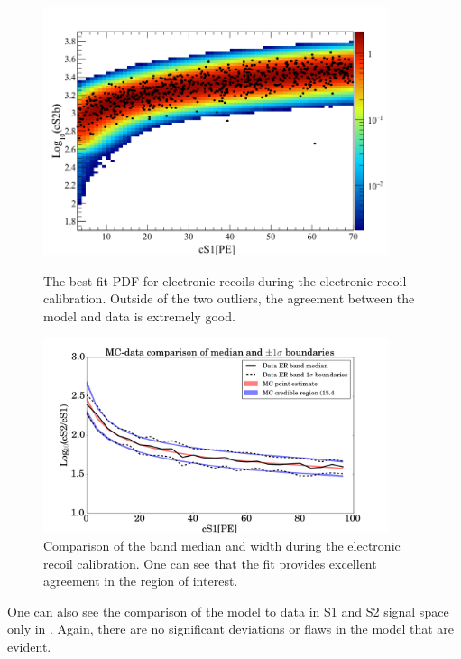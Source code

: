 \begin{figure}[p]
	\centering
	\includegraphics[width=0.9\textwidth]{xe1t_er_pdf_overlaid_data}
	\caption{The best-fit PDF for electronic recoils during the  electronic recoil calibration.  Outside of the two outliers, the agreement between the model and data is extremely good.}
	\label{fig:xe1t_er_pdf_overlaid_data}
	
	\centering
	\includegraphics[width=0.9\textwidth]{xe1t_er_band_width_median}
	\caption{Comparison of the band median and width during the electronic recoil calibration.  One can see that the fit provides excellent agreement in the region of interest.}
	\label{fig:xe1t_er_band_width_median}
\end{figure}
	
	
One can also see the comparison of the model to data in S1 and S2 signal space only in .  Again, there are no significant deviations or flaws in the model that are evident.
	
